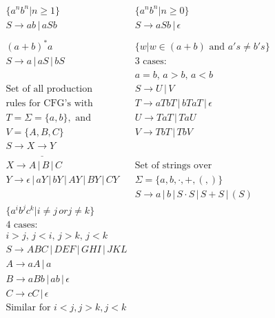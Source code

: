\documentclass[8pt,letterpaper,twocolumn]{article}
\begin{document}
\begin{eqnarray*}
  \{a^n b^n | n \geq 1\} & \{a^n b^n | n \geq 0\} \\
  S \rightarrow ab \,|\, aSb & S \rightarrow aSb \,|\, \epsilon \\
  \\
  (a+b)^*a & \{w | w \in (a+b) \mbox{ and } a's \neq b's\} \\
  S \rightarrow a \,|\, aS \,|\, bS & \mbox{3 cases:} \\
  & a = b,\, a > b,\, a < b \\
  \mbox{Set of all production} & S \rightarrow U \,|\, V \\
  \mbox{rules for CFG's with} & T \rightarrow aTbT \,|\, bTaT \,|\, \epsilon \\
  T=\Sigma=\{a,b\}, \mbox{ and} & U \rightarrow TaT \,|\, TaU \\ 
  V=\{A,B,C\} & V \rightarrow TbT \,|\, TbV \\
  S \rightarrow X \underline{\rightarrow} Y & \\
  X \rightarrow A \,|\, B \,|\, C & \mbox{Set of strings over} \\
  Y \rightarrow \epsilon \,|\, aY \,|\, bY \,|\, AY \,|\, BY \,|\, CY & \Sigma = \{a,b,\cdot,+,(,)\} \\
   & S \rightarrow a \,|\, b \,|\, S \cdot S \,|\, S + S \,|\, (S) \\
  \{a^i b^j c^k | i \neq j \, or j \neq k\} & \\
  \mbox{4 cases:} & \\
  i>j,\, j<i,\, j>k,\, j<k & \\
  S \rightarrow ABC \,|\, DEF \,|\, GHI \,|\, JKL  & \\
  A \rightarrow aA \,|\, a & \\
  B \rightarrow aBb \,|\, ab \,|\, \epsilon & \\
  C \rightarrow cC \,|\, \epsilon & \\
  \mbox{Similar for } i<j, j>k, j<k & \\ %
\end{eqnarray*}
\end{document}
